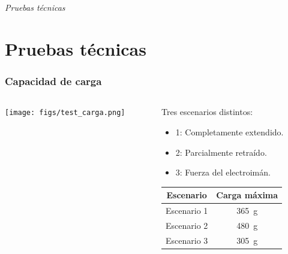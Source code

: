 \documentclass{beamer}
\begin{document}
\section*{}
\begin{frame}{}
  \centering \Huge
  \emph{Pruebas técnicas}
\end{frame}
\section{Pruebas técnicas}
\begin{frame}
  \frametitle{Capacidad de carga}
  \begin{columns}
    \begin{column}{0.35\textwidth} %
      \texttt{[image: figs/test\_carga.png]}
    \end{column}
    \begin{column}{0.5\textwidth} %
      Tres escenarios distintos:
      \begin{itemize}
        \item 1: Completamente extendido.
        \item 2: Parcialmente retraído.
        \item 3: Fuerza del electroimán.
      \end{itemize}
      \begin{table}[H]
        \begin{center}
        \begin{tabular}{|c|c|}
        \hline
        \textbf{Escenario} & \textbf{Carga máxima} \\
        \hline
        Escenario 1& \SI{365}{\gram} \\
        Escenario 2 & \SI{480}{\gram} \\
        Escenario 3 & \SI{305}{\gram} \\
        \hline
        \end{tabular}
        \end{center}
        \end{table}
    
      \end{column}
  \end{columns}
\end{frame}
\end{document}
